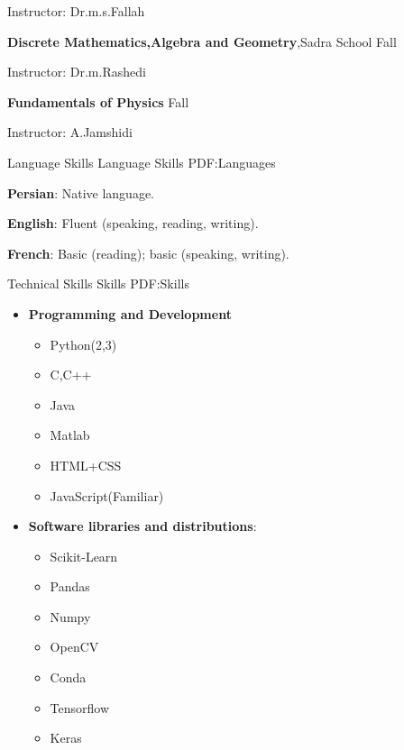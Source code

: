 \documentclass[letterpaper,MMMyyyy,nonstopmode]{simpleresumecv}
\begin{document}
\begin{Body}
\BulletItem
Instructor: Dr.m.s.Fallah


\Entry
\textbf{Discrete Mathematics,Algebra and Geometry},Sadra School
\hfill
Fall 

\BulletItem
Instructor: Dr.m.Rashedi



\Entry
\textbf{Fundamentals of Physics}
\hfill
Fall 

\BulletItem
Instructor: A.Jamshidi









\Section
{Language Skills}
{Language Skills}
{PDF:Languages}

\BulletItem
\textbf{Persian}: Native language.

\Gap
\BulletItem
\textbf {English}: Fluent (speaking, reading, writing).

\Gap
\BulletItem
\textbf{French}: Basic (reading); basic (speaking, writing).


\Section
{Technical Skills}
{Skills}
{PDF:Skills}

\Entry

\begin{itemize}
\item \textbf {Programming and Development}
\begin{itemize}
    \item Python(2,3)
    \item C,C++
    \item Java
    \item Matlab
    \item HTML+CSS
    \item JavaScript(Familiar)
\end{itemize}


    \item \textbf{ Software libraries and distributions}: 
    \begin{itemize}
        \item Scikit-Learn
        \item Pandas
        \item Numpy
        \item OpenCV
        \item Conda
        \item Tensorflow
        \item Keras
    \end{itemize}
     





\end{itemize}
\end{Body}
\end{document}
